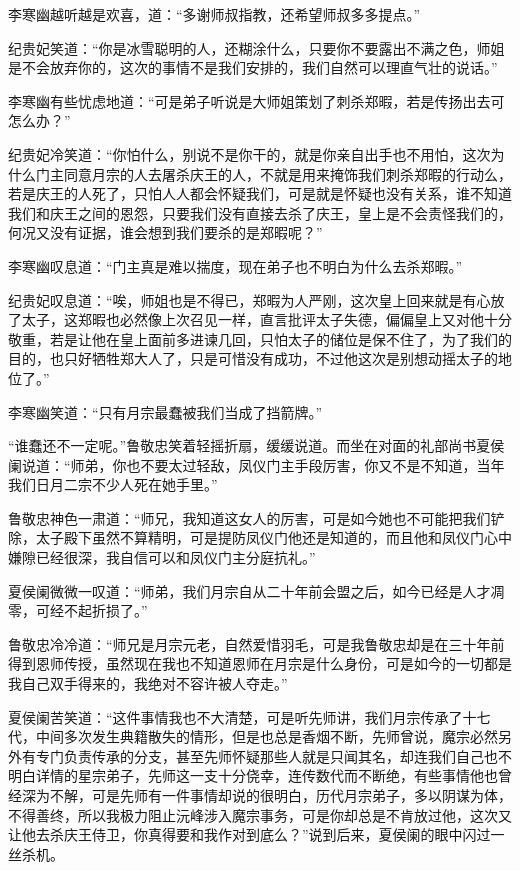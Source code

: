 李寒幽越听越是欢喜，道：“多谢师叔指教，还希望师叔多多提点。”

纪贵妃笑道：“你是冰雪聪明的人，还糊涂什么，只要你不要露出不满之色，师姐是不会放弃你的，这次的事情不是我们安排的，我们自然可以理直气壮的说话。”

李寒幽有些忧虑地道：“可是弟子听说是大师姐策划了刺杀郑暇，若是传扬出去可怎么办？”

纪贵妃冷笑道：“你怕什么，别说不是你干的，就是你亲自出手也不用怕，这次为什么门主同意月宗的人去屠杀庆王的人，不就是用来掩饰我们刺杀郑暇的行动么，若是庆王的人死了，只怕人人都会怀疑我们，可是就是怀疑也没有关系，谁不知道我们和庆王之间的恩怨，只要我们没有直接去杀了庆王，皇上是不会责怪我们的，何况又没有证据，谁会想到我们要杀的是郑暇呢？”

李寒幽叹息道：“门主真是难以揣度，现在弟子也不明白为什么去杀郑暇。”

纪贵妃叹息道：“唉，师姐也是不得已，郑暇为人严刚，这次皇上回来就是有心放了太子，这郑暇也必然像上次召见一样，直言批评太子失德，偏偏皇上又对他十分敬重，若是让他在皇上面前多进谏几回，只怕太子的储位是保不住了，为了我们的目的，也只好牺牲郑大人了，只是可惜没有成功，不过他这次是别想动摇太子的地位了。”

李寒幽笑道：“只有月宗最蠢被我们当成了挡箭牌。”

“谁蠢还不一定呢。”鲁敬忠笑着轻摇折扇，缓缓说道。而坐在对面的礼部尚书夏侯阑说道：“师弟，你也不要太过轻敌，凤仪门主手段厉害，你又不是不知道，当年我们日月二宗不少人死在她手里。”

鲁敬忠神色一肃道：“师兄，我知道这女人的厉害，可是如今她也不可能把我们铲除，太子殿下虽然不算精明，可是提防凤仪门他还是知道的，而且他和凤仪门心中嫌隙已经很深，我自信可以和凤仪门主分庭抗礼。”

夏侯阑微微一叹道：“师弟，我们月宗自从二十年前会盟之后，如今已经是人才凋零，可经不起折损了。”

鲁敬忠冷冷道：“师兄是月宗元老，自然爱惜羽毛，可是我鲁敬忠却是在三十年前得到恩师传授，虽然现在我也不知道恩师在月宗是什么身份，可是如今的一切都是我自己双手得来的，我绝对不容许被人夺走。”

夏侯阑苦笑道：“这件事情我也不大清楚，可是听先师讲，我们月宗传承了十七代，中间多次发生典籍散失的情形，但是也总是香烟不断，先师曾说，魔宗必然另外有专门负责传承的分支，甚至先师怀疑那些人就是只闻其名，却连我们自己也不明白详情的星宗弟子，先师这一支十分侥幸，连传数代而不断绝，有些事情他也曾经深为不解，可是先师有一件事情却说的很明白，历代月宗弟子，多以阴谋为体，不得善终，所以我极力阻止沅峰涉入魔宗事务，可是你却总是不肯放过他，这次又让他去杀庆王侍卫，你真得要和我作对到底么？”说到后来，夏侯阑的眼中闪过一丝杀机。


